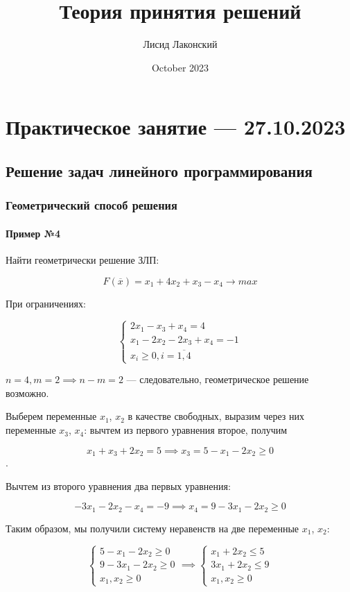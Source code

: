 \documentclass{article}
\title{Теория принятия решений}
\author{Лисид Лаконский}
\date{October 2023}
\begin{document}
\raggedright

\maketitle

\tableofcontents
\pagebreak

\section{Практическое занятие — 27.10.2023}

\subsection{Решение задач линейного программирования}

\subsubsection{Геометрический способ решения}

\paragraph{Пример №4}

Найти геометрически решение ЗЛП:

$$
F(\overline{x}) = x_1 + 4x_2 + x_3 - x_4 \to max
$$

При ограничениях:

$$
\begin{cases}
    2x_1 - x_3 + x_4 = 4 \\
    x_1 - 2x_2 - 2x_3 + x_4 = -1 \\
    x_i \ge 0, i = \overline{1, 4}
\end{cases}
$$

$n = 4, m = 2 \implies n - m = 2$ — следовательно, геометрическое решение возможно.

Выберем переменные $x_1$, $x_2$ в качестве свободных, выразим через них переменные $x_3$, $x_4$: вычтем из первого уравнения второе, получим  

$$x_1 + x_3 + 2x_2 = 5 \implies x_3 = 5 - x_1 - 2x_2 \ge 0$$.

Вычтем из второго уравнения два первых уравнения:

$$-3x_1 - 2x_2 - x_4 = -9 \implies x_4 = 9 - 3x_1 - 2x_2 \ge 0$$

Таким образом, мы получили систему неравенств на две переменные $x_1$, $x_2$:

$$
\begin{cases}
    5 - x_1 - 2x_2 \ge 0 \\ 
    9 - 3x_1 - 2x_2 \ge 0 \\
    x_1, x_2 \ge 0
\end{cases} \implies \begin{cases}
    x_1 + 2x_2 \le 5 \\
    3x_1 + 2x_2 \le 9 \\
    x_1, x_2 \ge 0
\end{cases}
$$
\end{document}
